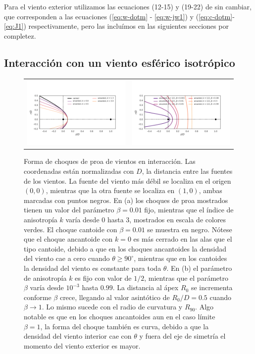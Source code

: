 Para el viento exterior utilizamos las ecuaciones (12-15) y (19-22) de \CRW{} sin cambiar, que corresponden a las ecuaciones (\ref{eq:w-dotm} - \ref{eq:w-jw1}) y (\ref{eq:c-dotm}-\ref{eq:J1}) respectivamente, pero las incluímos en las siguientes secciones por completez.

\subsection{Interacción con un viento esférico isotrópico}
\label{sec:mod-isotropic}

\begin{figure}
  \centering
  \begin{tabular}{lr}
    \includegraphics[width = 0.55\linewidth]{./Figures/cantoid-ancantoid-shape-bfixed} &
    \includegraphics[width=0.55\linewidth]{./Figures/ancantoid-shape}
  \end{tabular}
  \caption{Forma de choques de proa de vientos en interacción. Las coordenadas están normalizadas con $D$, la distancia entre las fuentes de los vientos. La fuente del viento más débil se localiza en el origen $(0, 0)$, mientras que la otra fuente se localiza en $(1, 0)$, ambas marcadas con puntos negros. En (a) los choques de proa mostrados tienen un valor del parámetro $\beta = 0.01$ fijo, mientras que el índice de anisotropía $k$ varía desde 0 hasta 3, mostrados en escala de colores verdes. El choque cantoide con $\beta=0.01$ se muestra en negro. Nótese que el choque ancantoide con $k=0$ es más cerrado en las alas que el tipo cantoide, debido a que en los choques ancantoides la densidad del viento cae a cero cuando $\theta \geq 90^\circ$, mientras que en los cantoides la densidad del viento es constante para toda $\theta$. En (b) el parámetro de anisotropía $k$ es fijo con valor de $1/2$, mientras que el parámetro $\beta$ varía desde $10^{-3}$ hasta $0.99$. La distancia al ápex $R_0$ se incrementa conforme $\beta$ crece, llegando al valor asintótico de $R_0/D = 0.5$ cuando $\beta\to 1$. Lo mismo sucede con el radio de curvatura y $R_{90}$. Algo notable es que en los choques ancantoides aun en el caso límite $\beta=1$, la forma del choque también es curva, debido a que la densidad del viento interior cae con $\theta$ y fuera del eje de simetría el momento del viento exterior es mayor.}

\end{figure}
